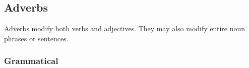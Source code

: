 \documentclass[../nihongo-gakushuu-kyouzai.tex]{subfiles}
\begin{document}
\appendix
\setcounter{section}{2}
\setcounter{subsection}{5}

\subsection{Adverbs}
Adverbs modify both verbs and adjectives. They may also modify entire noun phrases or sentences.


\subsubsection{Grammatical}
\begin{center}
\centering
{}
\label{tbl:appendix-vocab-adverbs-grammatical}
\end{center}
\end{document}
